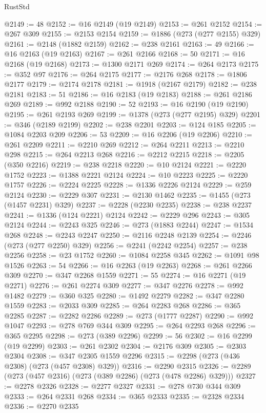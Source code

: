 \begin{lexlean}{RustStd}
\begin{coremodule}
{{{{{{{{{{{{{{{{{{{@2149 := 48
@2152 := @16 @2149 (@19 @2149)
@2153 := @261 @2152
@2154 := @267 @309
@2155 := @2153 @2154
@2159 := @1886 (@273 (@277 @2155) @329)
@2161 := @2148 (@1882 @2159)
@2162 := @238 @2161
@2163 := 49
@2166 := @16 @2163 (@19 @2163)
@2167 := @261 @2166
@2168 := 50
@2171 := @16 @2168 (@19 @2168)
@2173 := @1300 @2171 @269
@2174 := @264 @2173
@2175 := @352 @97
@2176 := @264 @2175
@2177 := @2176 @268
@2178 := @1806 @2177
@2179 := @2174 @2178
@2181 := @1918 (@2167 @2179)
@2182 := @238 @2181
@2183 := 51
@2186 := @16 @2183 (@19 @2183)
@2188 := @261 @2186 @269
@2189 := @992 @2188
@2190 := 52
@2193 := @16 @2190 (@19 @2190)
@2195 := @261 @2193 @269
@2199 := @1378 (@273 (@277 @2195) @329)
@2201 := @346 (@2189 @2199)
@2202 := @238 @2201
@2203 := @124 @185
@2205 := @1084 @2203 @209
@2206 := 53
@2209 := @16 @2206 (@19 @2206)
@2210 := @261 @2209
@2211 := @2210 @269
@2212 := @264 @2211
@2213 := @2210 @298
@2215 := @264 @2213 @268
@2216 := @2212 @2215
@2218 := @2205 (@350 @2216)
@2219 := @238 @2218
@2220 := @10 @2124
@2221 := @2220 @1752
@2223 := @1388 @2221 @2124
@2224 := @10 @2223
@2225 := @2220 @1757
@2226 := @2224 @2225
@2228 := @1336 @2226 @2124
@2229 := @259 @2124
@2230 := @2229 @307
@2231 := @2130 @1462
@2235 := @1455 (@273 (@1457 @2231) @329)
@2237 := @2228 (@2230 @2235)
@2238 := @238 @2237
@2241 := @1336 (@124 @2221) @2124
@2242 := @2229 @296
@2243 := @305 @2124
@2244 := @2243 @325
@2246 := @273 (@1883 @2244)
@2247 := @1534 @268
@2248 := @2243 @2247
@2250 := @2116 @2248 @2139
@2254 := @2246 (@273 (@277 @2250) @329)
@2256 := @2241 (@2242 @2254)
@2257 := @238 @2256
@2258 := @23 @1752
@2260 := @1084 @2258 @345
@2262 := @1091 @98 @1526
@2263 := 54
@2266 := @16 @2263 (@19 @2263)
@2268 := @261 @2266 @309
@2270 := @347 @2268 @1559
@2271 := 55
@2274 := @16 @2271 (@19 @2271)
@2276 := @261 @2274 @309
@2277 := @347 @2276
@2278 := @992 @1482
@2279 := @360 @325
@2280 := @1492 @2279
@2282 := @347 @2280 @1559
@2283 := @2033 @309
@2285 := @264 @2283 @268
@2286 := @365 @2285
@2287 := @2282 @2286
@2289 := @273 (@1777 @2287)
@2290 := @992 @1047
@2293 := @278 @769 @344 @309
@2295 := @264 @2293 @268
@2296 := @365 @2295
@2298 := @273 (@389 @2296)
@2299 := 56
@2302 := @16 @2299 (@19 @2299)
@2303 := @261 @2302
@2304 := @2176 @309
@2305 := @2303 @2304
@2308 := @347 @2305 @1559 @2296
@2315 := @2298 (@273 (@436 @2308) (@273 (@457 @2308) @329))
@2316 := @2290 @2315
@2326 := @2289 (@273 (@457 @2316) (@273 (@389 @2286) (@273 (@478 @2286) @329)))
@2327 := @2278 @2326
@2328 := @2277 @2327
@2331 := @278 @730 @344 @309
@2333 := @264 @2331 @268
@2334 := @365 @2333
@2335 := @2328 @2334
@2336 := @2270 @2335
}}}}}}}}}}}}}}}}}}}
\end{coremodule}
\end{lexlean}
